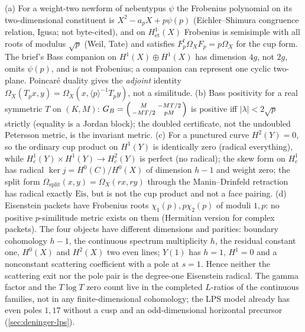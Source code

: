 \begin{theorem}
\label{thm:eisenstein-not-radical-not-exit}
(a) For a weight-two newform of nebentypus $\psi$ the Frobenius polynomial on its two-dimensional constituent is
$X^2-a_pX+p\psi(p)$ (Eichler--Shimura congruence relation, Igusa; not byte-cited), and on $H^1_{\mathrm{et}}(X)$ Frobenius is
semisimple with all roots of modulus $\sqrt p$ (Weil, Tate) and satisfies $F_p^{t}\Omega_XF_p = p\Omega_X$ for the cup form. %
The brief's Bass companion on $H^1(X)\oplus H^1(X)$ has dimension $4g$, not $2g$, omits $\psi(p)$, and is not Frobenius; a
companion can represent one cyclic two-plane. Poincar\'e duality gives the \emph{adjoint} identity
$\Omega_X(T_px,y) = \Omega_X(x,\langle p\rangle^{-1}T_py)$, not a similitude. (b) Bass positivity for a real symmetric $T$ on %
$(K,M)$: $G_B = \begin{psmallmatrix}M&-MT/2\\-MT/2&pM\end{psmallmatrix}$ is positive iff $|\lambda|<2\sqrt p$ strictly (equality is
a Jordan block); the doubled certificate, not the undoubled Petersson metric, is the invariant metric. (c) For a
punctured curve $H^2(Y) = 0$, so the ordinary cup product on $H^1(Y)$ is identically zero (radical everything), while
$H^1_c(Y)\times H^1(Y)\to H^2_c(Y)$ is perfect (no radical); the skew form on $H^1_c$ has radical $\ker j = H^0(C)/H^0(X)$ of
dimension $h-1$ and weight zero; the split form $\Omega_{\mathrm{split}}(x,y) = \Omega_X(rx,ry)$ through the Manin--Drinfeld %
retraction has radical exactly $\mathrm{Eis}$, but is not the cup product and not a face pairing. (d) Eisenstein packets
have Frobenius roots $\chi_1(p),p\chi_2(p)$ of moduli $1,p$: no positive $p$-similitude metric exists on them (Hermitian
version for complex packets). The four objects have different dimensions and parities: boundary cohomology $h-1$, the
continuous spectrum multiplicity $h$, the residual constant one, $H^0(X)$ and $H^2(X)$ two even lines; $Y(1)$ has $h = 1$,
$H^1 = 0$ and a nonconstant scattering coefficient with a pole at $s = 1$. Hence neither the scattering exit nor the pole
pair is the degree-one Eisenstein radical. The gamma factor and the $T\log T$ zero count live in the completed
$L$-ratios of the continuous families, not in any finite-dimensional cohomology; the LPS model already has even poles
$1,17$ without a cusp and an odd-dimensional horizontal precursor (\cref{sec:deninger-lps}).
\end{theorem}

